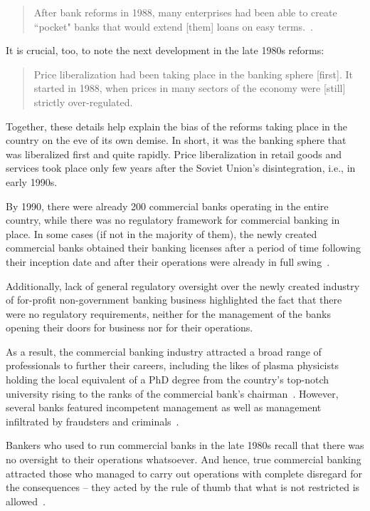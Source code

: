 \begin{quote}
After bank reforms in 1988, many enterprises had been able to create ``pocket" banks that would extend [them] loans on easy terms.~\citep[p.~105]{woodruff1999}.
\end{quote}

It is crucial, too, to note the next development in the late 1980s reforms:

\begin{quote}
Price liberalization had been taking place in the banking sphere [first]. It started in 1988, when prices in many sectors of the economy were [still] strictly over-regulated.~\citep{krotov2008b}
\end{quote}

Together, these details help explain the bias of the reforms taking place in the country on the eve of its own demise. In short, it was the banking sphere that was liberalized first and quite rapidly. Price liberalization in retail goods and services took place only few years after the Soviet Union's disintegration, i.e., in early 1990s. 

By 1990, there were already 200 commercial banks operating in the entire country, while there was no regulatory framework for commercial banking in place. In some cases (if not in the majority of them), the newly created commercial banks obtained their banking licenses after a period of time following their inception date and after their operations were already in full swing~\citep[p.~498]{krotov2008b}. 

Additionally, lack of general regulatory oversight over the newly created industry of for-profit non-government banking business highlighted the fact that there were no regulatory requirements, neither for the management of the banks opening their doors for business nor for their operations. 

As a result, the commercial banking industry attracted a broad range of professionals to further their careers, including the likes of plasma physicists holding the local equivalent of a PhD degree from the country's top-notch university rising to the ranks of the commercial bank's chairman~\citep[pp.~497-504]{krotov2008b}. However, several banks featured incompetent management as well as management infiltrated by fraudsters and criminals~\citep[p.~23]{krotov2008b}. 

Bankers who used to run commercial banks in the late 1980s recall that there was no oversight to their operations whatsoever. And hence, true commercial banking attracted those who managed to carry out operations with complete disregard for the consequences -- they acted by the rule of thumb that what is not restricted is allowed~\citep[pp.~158-159]{krotov2008b}.

